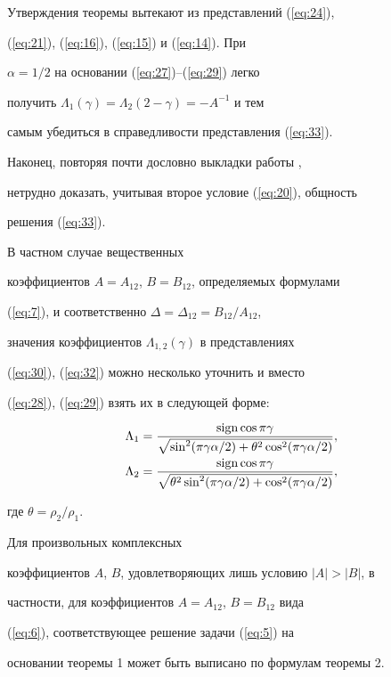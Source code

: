 Утверждения теоремы вытекают из представлений (\ref{eq:24}),


(\ref{eq:21}), (\ref{eq:16}), (\ref{eq:15}) и (\ref{eq:14}). При


$\alpha=1/2$ на основании (\ref{eq:27})--(\ref{eq:29}) легко


получить $\Lambda_1(\gamma)=\Lambda_2(2-\gamma)=-A^{-1}$ и тем


самым убедиться в справедливости представления (\ref{eq:33}).


Наконец, повторяя почти дословно выкладки работы \cite{O96},


нетрудно доказать, учитывая второе условие (\ref{eq:20}), общность


решения (\ref{eq:33}).





\begin{note}


В частном случае вещественных


коэффициентов $A=A_{12}$, $B=B_{12}$, определяемых формулами


(\ref{eq:7}), и соответственно $\Delta=\Delta_{12}=B_{12}/A_{12}$,


значения коэффициентов $\Lambda_{1,2}(\gamma)$ в представлениях


(\ref{eq:30}), (\ref{eq:32}) можно несколько уточнить и вместо


(\ref{eq:28}), (\ref{eq:29}) взять их в следующей форме:


\begin{align*}


\Lambda_1&=\frac{\sign\cos\pi\gamma}


{\sqrt{\sin^2(\pi\gamma\alpha/2)+\theta^2\cos^2(\pi\gamma\alpha/2)}},\\


\Lambda_2&=\frac{\sign\cos\pi\gamma}


{\sqrt{\theta^2\sin^2(\pi\gamma\alpha/2)+\cos^2(\pi\gamma\alpha/2)}},


\end{align*}


где $\theta=\rho_2/\rho_1$.


\end{note}





\begin{note}


Для произвольных комплексных


коэффициентов $A$, $B$, удовлетворяющих лишь условию $|A|>|B|$, в


частности, для коэффициентов $A=A_{12}$, $B=B_{12}$ вида


(\ref{eq:6}), соответствующее решение задачи (\ref{eq:5}) на


основании теоремы 1 может быть выписано по формулам теоремы 2.


\end{note}





